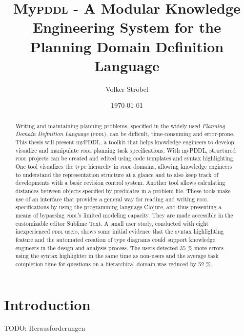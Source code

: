 \documentclass[a4paper,12pt]{report}
\author{Volker Strobel}
\date{\today}
\title{My\textsc{pddl} - A Modular Knowledge Engineering System for the Planning Domain Definition Language}
\newcommand{\mypddl}{\smallerft[0.8]{myPDDL}\xspace}
\newcommand{\pddl}{\textsc{pddl}\xspace}
\newcommand\smallerft[2][0.85]{{\scalefont{#1}#2}}
\begin{document}
\maketitle
\tableofcontents

\begin{abstract}
Writing and maintaining planning problems, specified in the widely
used \emph{Planning Domain Definition Language} (\textsc{pddl}), can be
difficult, time-consuming and error-prone. This thesis will present
\mypddl, a toolkit that helps knowledge engineers to develop,
visualize and manipulate \pddl planning task specifications. With
\mypddl, structured \pddl projects can be created and edited using
code templates and syntax highlighting. One tool visualizes the type
hierarchy in \pddl domains, allowing knowledge engineers to understand
the representation structure at a glance and to also keep track of
developments with a basic revision control system. Another tool allows
calculating distances between objects specified by predicates in a
problem file. These tools make use of an interface that provides a
general way for reading and writing \pddl specifications by using the
programming language Clojure, and thus presenting a means of bypassing
\pddl's limited modeling capacity. They are made accessible in the
customizable editor Sublime Text. A small user study, conducted with
eight inexperienced \pddl users, shows some initial evidence that the
syntax highlighting feature and the automated creation of type
diagrams could support knowledge engineers in the design and analysis
process. The users detected 35 \% more errors using the syntax
highlighter in the same time as non-users and the average task
completion time for questions on a hierarchical domain was reduced by
52 \%.
\end{abstract}

\chapter{Introduction}
\label{sec-1}
\label{ch:introduction}

TODO: Herausforderungen
\end{document}
